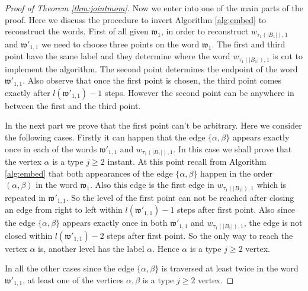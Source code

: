 \documentclass[12pt]{article}
\numberwithin{equation}{section}
\numberwithin{equation}{section}
\theoremstyle{definition}
\renewcommand{\1}{\bf 1}
\begin{document}
\begin{proof}[Proof of Theorem \ref{thm:jointmom}]
\noindent 
Now we enter into one of the main parts of the proof. Here we discuss the procedure to invert Algorithm \ref{alg:embed} to reconstruct the words. First of all given $\mathfrak{w}_{1}$, in order to reconstruct $w_{\tau_{1}(|B_{1}|),1}$ and $\mathfrak{w}'_{1,1}$ we need to choose three points on the word $\mathfrak{w}_{1}$. The first and third point have the same label and they determine where the word $w_{\tau_{1}(|B_{1}|),1}$ is cut to implement the algorithm. The second point determines the endpoint of the word $\mathfrak{w}'_{1,1}$. Also observe that once the first point is chosen, the third point comes exactly after $l(\mathfrak{w}'_{1,1})-1$ steps. However the second point can be anywhere in between the first and the third point. 

\noindent 
In the next part we prove that the first point can't be arbitrary. Here we consider the following cases. Firstly it can happen that the edge $\{ \alpha, \beta \}$ appears exactly once in each of the words $\mathfrak{w}'_{1,1}$ and $w_{\tau_{1}(|B_{1}|),1}$. In this case we shall prove that the vertex $\alpha$ is a type $j\ge 2$ instant. At this point recall from Algorithm \ref{alg:embed} that both appearances of the edge $\{ \alpha, \beta\}$ happen in the order $(\alpha,\beta)$ in the word $\mathfrak{w}_{1}$. Also this edge is the first edge in $w_{\tau_{1}(|B_{1}|),1}$ which is repeated in $\mathfrak{w}'_{1,1}$. So the level of the first point can not be reached after closing an edge from right to left within $l(\mathfrak{w}'_{1,1})-1$ steps after first point. Also since the edge $\{\alpha, \beta \}$ appears exactly once in both $\mathfrak{w}'_{1,1}$ and $w_{\tau_{1}(|B_{1}|),1}$, the edge is not closed within $l(\mathfrak{w}'_{1,1})-2$ steps after first point. So the only way to reach the vertex $\alpha$ is, another level has the label $\alpha$. Hence $\alpha$ is a type $j \ge 2$ vertex. 

\noindent 
In all the other cases since the edge $\{ \alpha, \beta \}$ is traversed at least twice in the word $\mathfrak{w}'_{1,1}$, at least one of the vertices $\alpha,\beta$ is a type $j \ge 2$ vertex.


\end{proof}
\end{document}
